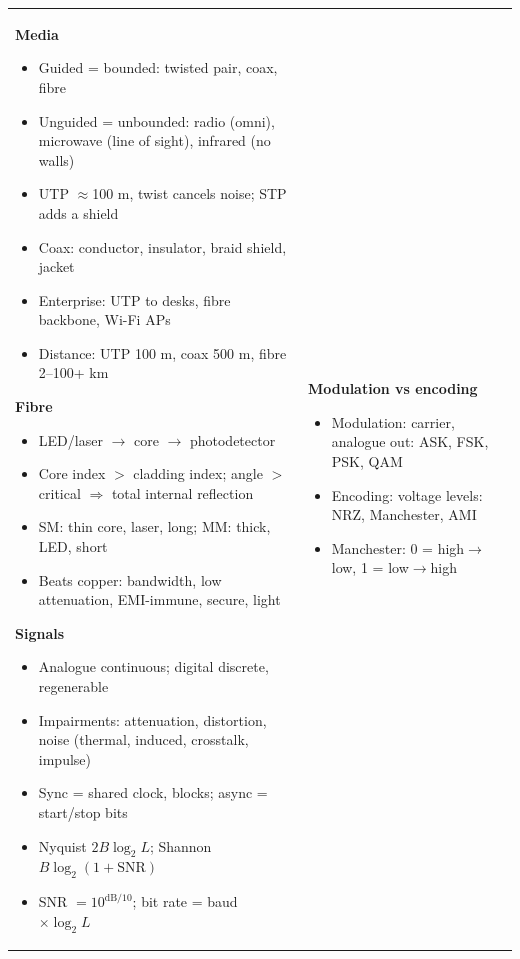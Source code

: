 \documentclass[10pt]{article}
\begin{document}
\newpage
\begin{cheatsheet}
\small
\begin{tabularx}{\linewidth}{@{}XX@{}}
\textbf{Media}
\begin{itemize}
\item Guided = bounded: twisted pair, coax, fibre
\item Unguided = unbounded: radio (omni), microwave (line of sight), infrared (no walls)
\item UTP $\approx$100 m, twist cancels noise; STP adds a shield
\item Coax: conductor, insulator, braid shield, jacket
\item Enterprise: UTP to desks, fibre backbone, Wi-Fi APs
\item Distance: UTP 100 m, coax 500 m, fibre 2--100+ km
\end{itemize}
\textbf{Fibre}
\begin{itemize}
\item LED/laser $\to$ core $\to$ photodetector
\item Core index $>$ cladding index; angle $>$ critical $\Rightarrow$ total internal reflection
\item SM: thin core, laser, long; MM: thick, LED, short
\item Beats copper: bandwidth, low attenuation, EMI-immune, secure, light
\end{itemize}
\textbf{Signals}
\begin{itemize}
\item Analogue continuous; digital discrete, regenerable
\item Impairments: attenuation, distortion, noise (thermal, induced, crosstalk, impulse)
\item Sync = shared clock, blocks; async = start/stop bits
\item Nyquist $2B\log_2 L$; Shannon $B\log_2(1+\text{SNR})$
\item SNR $= 10^{\text{dB}/10}$; bit rate = baud $\times \log_2 L$
\end{itemize}
&
\textbf{Modulation vs encoding}
\begin{itemize}
\item Modulation: carrier, analogue out: ASK, FSK, PSK, QAM
\item Encoding: voltage levels: NRZ, Manchester, AMI
\item Manchester: 0 = high$\to$low, 1 = low$\to$high
\end{itemize}

\end{tabularx}
\end{cheatsheet}
\end{document}
